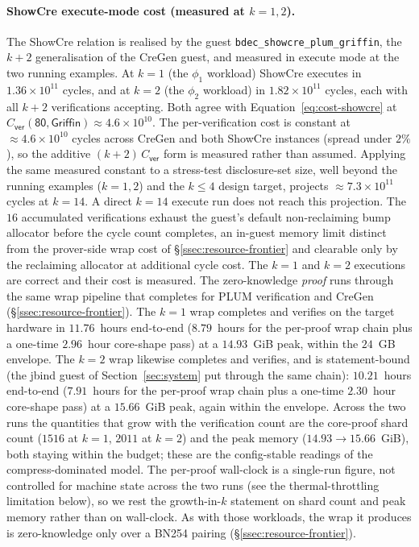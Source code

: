 \paragraph{ShowCre execute-mode cost (measured at $k=1,2$).}
The ShowCre relation is realised by the guest \texttt{bdec\_showcre\_plum\_griffin}, the $k+2$ generalisation of the CreGen guest, and measured in execute mode at the two running examples. At $k=1$ (the $\phi_1$ workload) ShowCre executes in $1.36\times10^{11}$ cycles, and at $k=2$ (the $\phi_2$ workload) in $1.82\times10^{11}$ cycles, each with all $k+2$ verifications accepting. Both agree with Equation~\eqref{eq:cost-showcre} at $C_{\mathsf{ver}}(\textsf{80},\textsf{Griffin})\approx 4.6\times10^{10}$. The per-verification cost is constant at $\approx 4.6\times10^{10}$ cycles across CreGen and both ShowCre instances (spread under $2\%$), so the additive $(k+2)\,C_{\mathsf{ver}}$ form is measured rather than assumed. Applying the same measured constant to a stress-test disclosure-set size, well beyond the running examples ($k=1,2$) and the $k\le 4$ design target, projects $\approx 7.3\times10^{11}$ cycles at $k=14$. A direct $k=14$ execute run does not reach this projection. The $16$ accumulated verifications exhaust the guest's default non-reclaiming bump allocator before the cycle count completes, an in-guest memory limit distinct from the prover-side wrap cost of \S\ref{ssec:resource-frontier} and clearable only by the reclaiming allocator at additional cycle cost. The $k=1$ and $k=2$ executions are correct and their cost is measured. The zero-knowledge \emph{proof} runs through the same wrap pipeline that completes for PLUM verification and CreGen (\S\ref{ssec:resource-frontier}). The $k=1$ wrap completes and verifies on the target hardware in $11.76$~hours end-to-end ($8.79$~hours for the per-proof wrap chain plus a one-time $2.96$~hour core-shape pass) at a $14.93$~GiB peak, within the $24$~GB envelope. The $k=2$ wrap likewise completes and verifies, and is statement-bound (the jbind guest of Section~\ref{sec:system} put through the same chain): $10.21$~hours end-to-end ($7.91$~hours for the per-proof wrap chain plus a one-time $2.30$~hour core-shape pass) at a $15.66$~GiB peak, again within the envelope. Across the two runs the quantities that grow with the verification count are the core-proof shard count ($1516$ at $k=1$, $2011$ at $k=2$) and the peak memory ($14.93\rightarrow15.66$~GiB), both staying within the budget; these are the config-stable readings of the compress-dominated model. The per-proof wall-clock is a single-run figure, not controlled for machine state across the two runs (see the thermal-throttling limitation below), so we rest the growth-in-$k$ statement on shard count and peak memory rather than on wall-clock. As with those workloads, the wrap it produces is zero-knowledge only over a {BN254} pairing (\S\ref{ssec:resource-frontier}).

